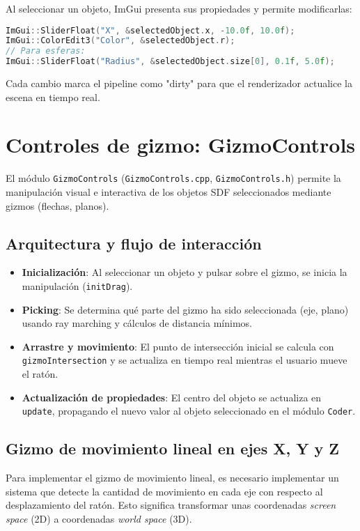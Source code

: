 Al seleccionar un objeto, ImGui presenta sus propiedades y permite
modificarlas:
\begin{lstlisting}[language=C++,caption={Edición de propiedades de un objeto SDF seleccionado}]
ImGui::SliderFloat("X", &selectedObject.x, -10.0f, 10.0f);
ImGui::ColorEdit3("Color", &selectedObject.r);
// Para esferas:
ImGui::SliderFloat("Radius", &selectedObject.size[0], 0.1f, 5.0f);
\end{lstlisting}
Cada cambio marca el pipeline como "dirty" para que el renderizador actualice
la escena en tiempo real.

\section{Controles de gizmo: GizmoControls}

El módulo \texttt{GizmoControls} (\texttt{GizmoControls.cpp},
\texttt{GizmoControls.h}) permite la manipulación visual e interactiva de los
objetos SDF seleccionados mediante gizmos (flechas, planos).

\subsection{Arquitectura y flujo de interacción}

\begin{itemize}
    \item \textbf{Inicialización}: Al seleccionar un objeto y pulsar sobre el gizmo, se inicia la manipulación (\texttt{initDrag}).
    \item \textbf{Picking}: Se determina qué parte del gizmo ha sido seleccionada (eje, plano) usando ray marching y cálculos de distancia mínimos.
    \item \textbf{Arrastre y movimiento}: El punto de intersección inicial se calcula con \texttt{gizmoIntersection} y se actualiza en tiempo real mientras el usuario mueve el ratón.
    \item \textbf{Actualización de propiedades}: El centro del objeto se actualiza en \texttt{update}, propagando el nuevo valor al objeto seleccionado en el módulo \texttt{Coder}.
\end{itemize}


\subsection{Gizmo de movimiento lineal en ejes X, Y y Z}

Para implementar el gizmo de movimiento lineal, es necesario implementar un
sistema que detecte la cantidad de movimiento en cada eje con respecto al
desplazamiento del ratón. Esto significa transformar unas coordenadas
\textit{screen space} (2D) a coordenadas \textit{world space} (3D).

